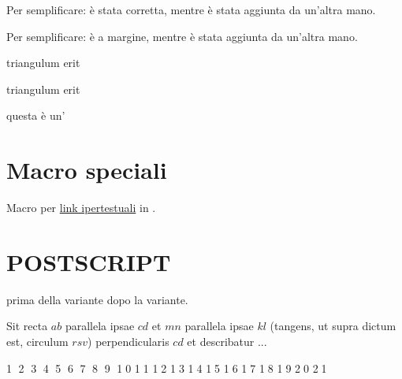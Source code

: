 \documentclass[12pt]{book}
\begin{document}
 Per
semplificare:  \`e stata corretta,
mentre  \`e stata aggiunta da un'altra mano.
\par
  Per semplificare: 
\`e a margine, mentre  \`e stata aggiunta da
un'altra mano.  \par
 triangulum  erit \par
 triangulum  erit \par
questa {\`e} un'

\section{Macro speciali}

\par Macro per \href{http://www.w3c.org}{link ipertestuali} in
.

\section{POSTSCRIPT}

\par prima della variante
 dopo la variante.
\par
Sit recta $ab$ parallela ipsae $cd$ et 
$mn$ parallela ipsae $kl$ (tangens, ut
supra dictum est, circulum $rsv$)
 perpendicularis
$cd$ et describatur ...

\par

\textcircled{1 }
\textcircled{2 }
\textcircled{3 }
\textcircled{4 }
\textcircled{5 }
\textcircled{6 }
\textcircled{7 }
\textcircled{8 }
\textcircled{9 }
\textcircled{10}
\textcircled{11} 
\textcircled{12} 
\textcircled{13} 
\textcircled{14} 
\textcircled{15} 
\textcircled{16} 
\textcircled{17} 
\textcircled{18} 
\textcircled{19} 
\textcircled{20}
\textcircled{21}

\par

%
%
%
%
\end{document}
